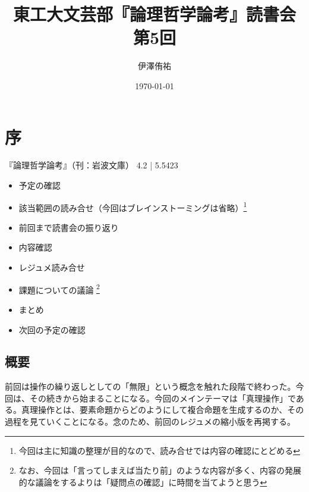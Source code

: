 \documentclass[a4paper,onecolumn,article]{jarticle}
\title{東工大文芸部『論理哲学論考』読書会 第5回}
\author{伊澤侑祐}
\date{\today}
\newcounter{ct}               %
\begin{document}
\maketitle

\section{序}

『論理哲学論考』（刊：岩波文庫） 4.2 | 5.5423
\\

{\small
\begin{itemize}
  \item 予定の確認
  \item 該当範囲の読み合せ（今回はブレインストーミングは省略）\footnote{今回は主に知識の整理が目的なので、読み合せでは内容の確認にとどめる}
  \item 前回まで読書会の振り返り
  \item 内容確認
  \item レジュメ読み合せ
  \item 課題についての議論 \footnote{なお、今回は「言ってしまえば当たり前」のような内容が多く、内容の発展的な議論をするよりは「疑問点の確認」に時間を当てようと思う}
  \item まとめ
  \item 次回の予定の確認
\end{itemize} }

\subsection{概要}
前回は操作の繰り返しとしての「無限」という概念を触れた段階で終わった。今回は、その続きから始まることになる。今回のメインテーマは「真理操作」である。真理操作とは、要素命題からどのようにして複合命題を生成するのか、その過程を見ていくことになる。念のため、前回のレジュメの縮小版を再掲する。
\end{document}
